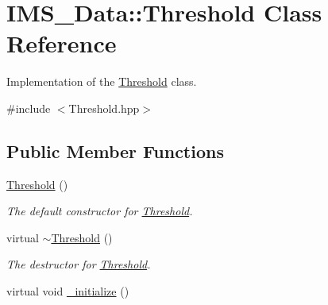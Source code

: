 \hypertarget{classIMS__Data_1_1Threshold}{
\section{IMS\_\-Data::Threshold Class Reference}
\label{classIMS__Data_1_1Threshold}
}


Implementation of the \hyperlink{classIMS__Data_1_1Threshold}{Threshold} class.  




{\ttfamily \#include $<$Threshold.hpp$>$}

\subsection*{Public Member Functions}
\begin{DoxyCompactItemize}
\item 
\hypertarget{classIMS__Data_1_1Threshold_a3a8b37e512c90883f0e93bb97fdcd2a7}{
\hyperlink{classIMS__Data_1_1Threshold_a3a8b37e512c90883f0e93bb97fdcd2a7}{Threshold} ()}
\label{classIMS__Data_1_1Threshold_a3a8b37e512c90883f0e93bb97fdcd2a7}

\begin{DoxyCompactList}\small\item\em The default constructor for \hyperlink{classIMS__Data_1_1Threshold}{Threshold}. \item\end{DoxyCompactList}\item 
\hypertarget{classIMS__Data_1_1Threshold_ac512ede185450da817f38c3e1459d64b}{
virtual \hyperlink{classIMS__Data_1_1Threshold_ac512ede185450da817f38c3e1459d64b}{$\sim$Threshold} ()}
\label{classIMS__Data_1_1Threshold_ac512ede185450da817f38c3e1459d64b}

\begin{DoxyCompactList}\small\item\em The destructor for \hyperlink{classIMS__Data_1_1Threshold}{Threshold}. \item\end{DoxyCompactList}\item 
\hypertarget{classIMS__Data_1_1Threshold_a60db6d46b12bf55cdeef359d30928cd7}{
virtual void \hyperlink{classIMS__Data_1_1Threshold_a60db6d46b12bf55cdeef359d30928cd7}{\_\-initialize} ()}
\label{classIMS__Data_1_1Threshold_a60db6d46b12bf55cdeef359d30928cd7}


\end{DoxyCompactItemize}
